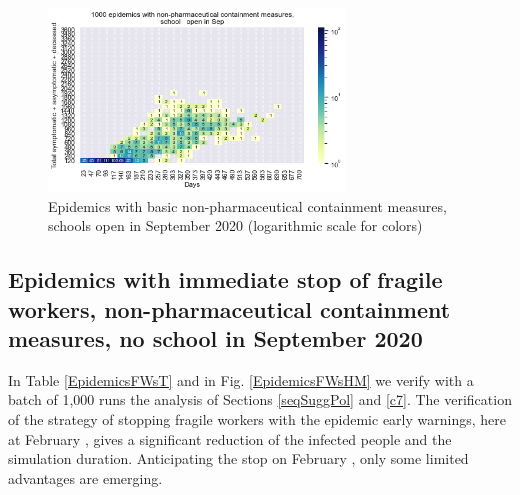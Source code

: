 \documentclass[11pt]{article}
\begin{document}
\begin{figure}[H]
\begin{center}
\includegraphics[width=0.7\textwidth]{HM30_readRunResults1k_basicControl_schoolOpenSept_plusHMlog.png}
\caption{Epidemics with basic non-pharmaceutical containment measures, schools open in September 2020 (logarithmic scale for colors)}
\label{EpidemicsWithAndSchoolHM}
\end{center}
\end{figure}



\subsection{Epidemics with immediate stop of fragile workers, non-pharmaceutical containment measures, no school in September 2020}
\label{EpidemicsFWsS}


In Table \ref{EpidemicsFWsT} and in Fig. \ref{EpidemicsFWsHM} we verify with a batch of 1,000 runs the analysis of Sections \ref{seqSuggPol} and \ref{c7}. The verification of the strategy of stopping fragile workers with the epidemic early warnings, here at February , gives a significant reduction of the infected people and the simulation duration. Anticipating the stop on February , only some limited advantages are emerging.
\end{document}
